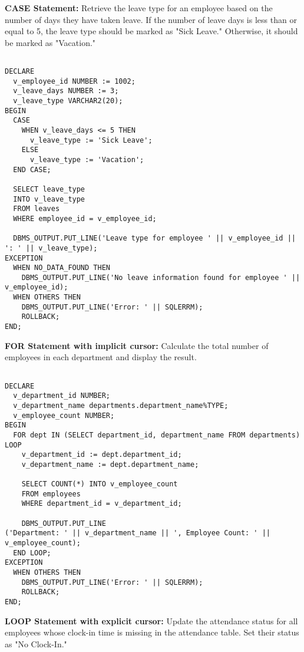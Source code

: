 \documentclass[11pt]{article} %
\begin{document}
\textbf{CASE Statement:} Retrieve the leave type for an employee based on the number of days they have taken leave. If the number of leave days is less than or equal to 5, the leave type should be marked as "Sick Leave." Otherwise, it should be marked as "Vacation."

\begin{small}
\begin{verbatim}

DECLARE
  v_employee_id NUMBER := 1002;
  v_leave_days NUMBER := 3;
  v_leave_type VARCHAR2(20);
BEGIN
  CASE
    WHEN v_leave_days <= 5 THEN
      v_leave_type := 'Sick Leave';
    ELSE
      v_leave_type := 'Vacation';
  END CASE;

  SELECT leave_type
  INTO v_leave_type
  FROM leaves
  WHERE employee_id = v_employee_id;

  DBMS_OUTPUT.PUT_LINE('Leave type for employee ' || v_employee_id || ': ' || v_leave_type);
EXCEPTION
  WHEN NO_DATA_FOUND THEN
    DBMS_OUTPUT.PUT_LINE('No leave information found for employee ' || v_employee_id);
  WHEN OTHERS THEN
    DBMS_OUTPUT.PUT_LINE('Error: ' || SQLERRM);
    ROLLBACK;
END;

\end{verbatim}
\end{small}

\textbf{FOR Statement with implicit cursor:} Calculate the total number of employees in each department and display the result.

\begin{small}
\begin{verbatim}

DECLARE
  v_department_id NUMBER;
  v_department_name departments.department_name%TYPE;
  v_employee_count NUMBER;
BEGIN
  FOR dept IN (SELECT department_id, department_name FROM departments) LOOP
    v_department_id := dept.department_id;
    v_department_name := dept.department_name;

    SELECT COUNT(*) INTO v_employee_count
    FROM employees
    WHERE department_id = v_department_id;

    DBMS_OUTPUT.PUT_LINE
('Department: ' || v_department_name || ', Employee Count: ' || v_employee_count);
  END LOOP;
EXCEPTION
  WHEN OTHERS THEN
    DBMS_OUTPUT.PUT_LINE('Error: ' || SQLERRM);
    ROLLBACK;
END;

\end{verbatim}
\end{small}

\textbf{LOOP Statement with explicit cursor:} Update the attendance status for all employees whose clock-in time is missing in the attendance table. Set their status as "No Clock-In."
\end{document}
